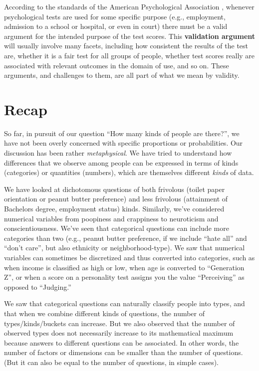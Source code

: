 \documentclass[
  openany]{book}
\begin{document}
According to the standards of the American Psychological Association \citep{american1999}, whenever psychological tests are used for some specific purpose (e.g., employment, admission to a school or hospital, or even in court) there must be a valid argument for the intended purpose of the test scores. This \textbf{validation argument} will usually involve many facets, including how consistent the results of the test are, whether it is a fair test for all groups of people, whether test scores really are associated with relevant outcomes in the domain of use, and so on. These arguments, and challenges to them, are all part of what we mean by validity.

\hypertarget{recap-1}{%
\section*{Recap}\label{recap-1}}

So far, in pursuit of our question ``How many kinds of people are there?'', we have not been overly concerned with specific proportions or probabilities. Our discussion has been rather \emph{metaphysical}. We have tried to understand how differences that we observe among people can be expressed in terms of kinds (categories) or quantities (numbers), which are themselves different \emph{kinds} of data.

We have looked at dichotomous questions of both frivolous (toilet paper orientation or peanut butter preference) and less frivolous (attainment of Bachelors degree, employment status) kinds. Similarly, we've considered numerical variables from poopiness and crappiness to neuroticism and conscientiousness. We've seen that categorical questions can include more categories than two (e.g., peanut butter preference, if we include ``hate all'' and ``don't care'', but also ethnicity or neighborhood-type). We saw that numerical variables can sometimes be discretized and thus converted into categories, such as when income is classified as high or low, when age is converted to ``Generation Z'', or when a score on a personality test assigns you the value ``Perceiving'' as opposed to ``Judging.''

We saw that categorical questions can naturally classify people into types, and that when we combine different kinds of questions, the number of types/kinds/buckets can increase. But we also observed that the number of observed types does not necessarily increase to its mathematical maximum because answers to different questions can be associated. In other words, the number of factors or dimensions can be smaller than the number of questions. (But it can also be equal to the number of questions, in simple cases).
\end{document}
